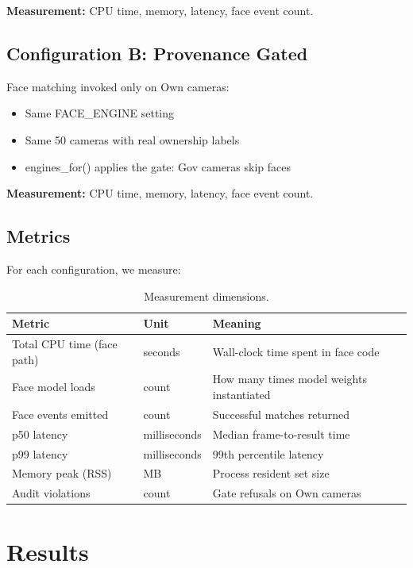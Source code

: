 \documentclass[sigplan,review]{acmart}
\begin{document}
\textbf{Measurement:} CPU time, memory, latency, face event count.

\subsection{Configuration B: Provenance Gated}

Face matching invoked only on Own cameras:
\begin{itemize}
  \item Same FACE\_ENGINE setting
  \item Same 50 cameras with real ownership labels
  \item engines\_for() applies the gate: Gov cameras skip faces
\end{itemize}

\textbf{Measurement:} CPU time, memory, latency, face event count.

\subsection{Metrics}

For each configuration, we measure:

\begin{table}[h]
  \centering
  \small
  \begin{tabular}{lll}
    \toprule
    \textbf{Metric} & \textbf{Unit} & \textbf{Meaning} \\
    \midrule
    Total CPU time (face path) & seconds & Wall-clock time spent in face code \\
    Face model loads & count & How many times model weights instantiated \\
    Face events emitted & count & Successful matches returned \\
    p50 latency & milliseconds & Median frame-to-result time \\
    p99 latency & milliseconds & 99th percentile latency \\
    Memory peak (RSS) & MB & Process resident set size \\
    Audit violations & count & Gate refusals on Own cameras \\
    \bottomrule
  \end{tabular}
  \caption{Measurement dimensions.}
  \label{tab:metrics}
\end{table}

\section{Results}
\end{document}
